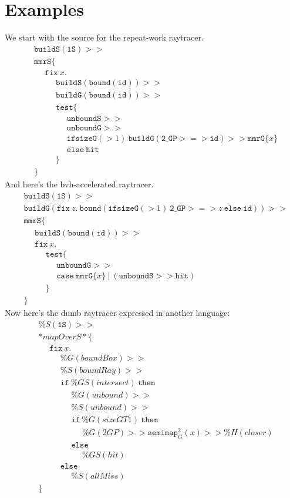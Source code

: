 \documentclass{article}
\newcommand {\fix}{\mathtt{fix}}
\newcommand {\test}{\mathtt{test}}
\newcommand {\isect}{\mathtt{hit}}
\newcommand {\buildG}{\mathtt{buildG}}
\newcommand {\buildS}{\mathtt{buildS}}
\newcommand {\id}{\mathtt{id}}
\newcommand {\unboundG}{\mathtt{unboundG}}
\newcommand {\unboundS}{\mathtt{unboundS}}
\newcommand {\mmrG}{\mathtt{mmrG}}
\newcommand {\mmrS}{\mathtt{mmrS}}
\newcommand {\oneS}{\mathtt{1S}}
\newcommand {\twoGP}{\mathtt{2\_GP}}
\newcommand {\semimap}{\mathtt{semimap}}
\newcommand {\bound}{\mathtt{bound}}
\newcommand {\normalSpacing}{\setlength{\jot}{1ex}}
\newcommand {\tab}{~~~~~~}
\begin{document}
\section{Examples}
\normalSpacing
We start with the source for the repeat-work raytracer.
\begin{align*}
&\buildS (\oneS) >> \\
&\mmrS \{ \\
&\tab\fix~x. \\
&\tab\tab \buildS(\bound (\mathtt{id})) >> \\
&\tab\tab \buildG(\bound (\mathtt{id})) >> \\
&\tab\tab\test \{ \\
&\tab\tab\tab \unboundS >> \\
&\tab\tab\tab \unboundG >> \\
&\tab\tab\tab \mathtt{ifsizeG}(>1)~\buildG (\twoGP >=> \id) >> \mmrG \{x\} \\
&\tab\tab\tab \mathtt{else}~\isect \\
&\tab \tab \} \\
&\}
\end{align*}
And here's the bvh-accelerated raytracer.
\begin{align*}
&\buildS (\oneS) >> \\
&\buildG (\fix~z.~\bound(\mathtt{ifsizeG}(>1)~\twoGP >=> z~\mathtt{else}~\id)) >> \\
&\mmrS \{ \\
&\tab \buildS(\bound (\mathtt{id})) >> \\
&\tab\fix~x. \\
&\tab\tab\test \{ \\
&\tab\tab\tab \unboundG >> \\
&\tab\tab\tab \mathtt {case}~\mmrG\{x\}~|~(\unboundS>>\isect) \\
&\tab \tab \} \\
&\}
\end{align*}
Now here's the dumb raytracer expressed in another language:
\begin{align*}
&\%S (\oneS) >> \\
&*mapOverS* \{ \\
&\tab\fix~x. \\
&\tab\tab \%G(boundBox) >> \\
&\tab\tab \%S(boundRay) >> \\
&\tab\tab \mathtt{if}~\%GS(intersect)~\mathtt{then} \\
&\tab\tab\tab \%G(unbound) >> \\
&\tab\tab\tab \%S(unbound) >> \\
&\tab\tab\tab \mathtt{if}~\%G(sizeGT1)~\mathtt{then}\\
&\tab\tab\tab\tab \%G(2GP) >> \semimap_G^{2}(x) >> \%H(closer) \\
&\tab\tab\tab \mathtt{else}\\
&\tab\tab\tab\tab \%GS(hit)  \\
&\tab\tab \mathtt{else} \\
&\tab\tab\tab \%S(allMiss)\\
&\}
\end{align*}
\end{document}

